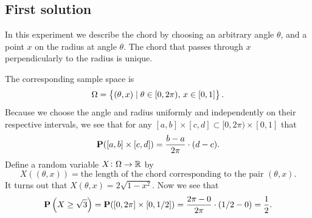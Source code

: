 \documentclass[11pt,a4paper]{article}
\begin{document}
\subsection{First solution}
In this experiment we describe the chord by choosing an arbitrary angle
$\theta$, and a point $x$ on the radius at angle $\theta$. The chord
that passes through $x$ perpendicularly to the radius is unique.
\begin{center}
\end{center}
The corresponding sample space is
\[
  \Omega = \left\{(\theta, x) \mid \theta \in [0, 2 \pi),\, x \in [0,1]\right\}.
\]
Because we choose the angle and radius uniformly and independently
on their respective intervals, we see that for any 
$[a,b] \times [c,d] \subset [0, 2 \pi) \times [0,1]$ that
\[
  \mathbf{P}([a,b] \times [c,d]) = \frac{b-a}{2 \pi} \cdot (d-c).
\]
Define a random variable $X \colon \Omega \to \mathbb{R}$ by
\[
  X\left((\theta, x)\right) = \text{the length of the chord corresponding
  to the pair $(\theta, x)$}.
\]
It turns out that $X(\theta,x) = 2 \sqrt{1 - x^2}$.
Now we see that
\[
  \mathbf{P}\left(X \geq \sqrt{3}\right) = 
  \mathbf{P}([0,2 \pi] \times [0,1/2]) =
  \frac{2 \pi-0}{2 \pi} \cdot (1/2-0) =
  \frac{1}{2}.
\]
\end{document}
